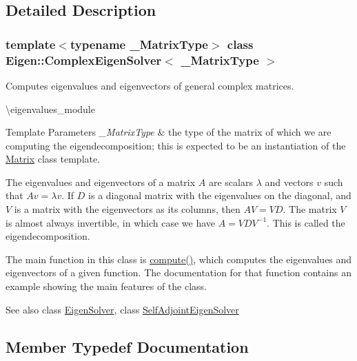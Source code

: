 \subsection{Detailed Description}
\subsubsection*{template$<$typename \+\_\+\+Matrix\+Type$>$\newline
class Eigen\+::\+Complex\+Eigen\+Solver$<$ \+\_\+\+Matrix\+Type $>$}

Computes eigenvalues and eigenvectors of general complex matrices. 

\textbackslash{}eigenvalues\+\_\+module


\begin{DoxyTemplParams}{Template Parameters}
{\em \+\_\+\+Matrix\+Type} & the type of the matrix of which we are computing the eigendecomposition; this is expected to be an instantiation of the \mbox{\hyperlink{class_eigen_1_1_matrix}{Matrix}} class template.\\
\hline
\end{DoxyTemplParams}
The eigenvalues and eigenvectors of a matrix $ A $ are scalars $ \lambda $ and vectors $ v $ such that $ Av = \lambda v $. If $ D $ is a diagonal matrix with the eigenvalues on the diagonal, and $ V $ is a matrix with the eigenvectors as its columns, then $ A V = V D $. The matrix $ V $ is almost always invertible, in which case we have $ A = V D V^{-1} $. This is called the eigendecomposition.

The main function in this class is \mbox{\hyperlink{class_eigen_1_1_complex_eigen_solver_aeb7e38c6db5369f5c974f3786e94c1f0}{compute()}}, which computes the eigenvalues and eigenvectors of a given function. The documentation for that function contains an example showing the main features of the class.

\begin{DoxySeeAlso}{See also}
class \mbox{\hyperlink{class_eigen_1_1_eigen_solver}{Eigen\+Solver}}, class \mbox{\hyperlink{class_eigen_1_1_self_adjoint_eigen_solver}{Self\+Adjoint\+Eigen\+Solver}} 
\end{DoxySeeAlso}


\subsection{Member Typedef Documentation}
\mbox{\label{class_eigen_1_1_complex_eigen_solver_a3604c99a69fac3bee42c88cb2b589143}} 
